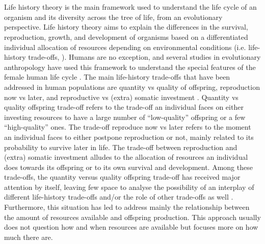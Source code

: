 \documentclass{article}
\begin{document}
\\\\
Life history theory is the main framework used to understand the life cycle of an organism and its diversity across the tree of life,  from an evolutionary perspective. Life history theory aims to explain the differences in the survival, reproduction, growth, and development of organisms based on a differentiated individual allocation of resources depending on environmental conditions (i.e. life-history trade-offs, \citep{stearns2000life}). Humans are no exception, and several studies in evolutionary anthropology have used this framework to understand the special features of the female human life cycle \citep{mace2000evolutionary,borgerhoff2012human}. The main life-history trade-offs that have been addressed in human populations are quantity vs quality of offspring, reproduction now vs later, and reproductive vs (extra) somatic investment \citep{hill1999life}. Quantity vs quality offspring trade-off refers to the trade-off an individual faces on either investing resources to have a large number of “low-quality” offspring or a few “high-quality” ones. The trade-off reproduce now vs later refers to the moment an individual faces to either postpone reproduction or not, mainly related to its probability to survive later in life. The trade-off between reproduction and (extra) somatic investment alludes to the allocation of resources an individual does towards its offspring or to its own survival and development. Among these trade-offs, the quantity versus quality offspring trade-off has received major attention by itself, leaving few space to analyse the possibility of an interplay of different life-history trade-offs and/or the role of other trade-offs as well \citep{lawson2016offspring}. Furthermore, this situation has led to address mainly the relationship between the amount of resources available and offspring production. This approach usually does not question how and when resources are available but focuses more on how much there are.
\\\\
\end{document}
